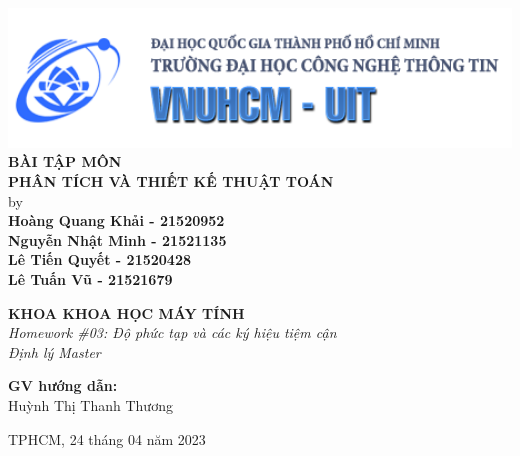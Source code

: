 
\begin{titlepage}

\begin{center}

\includegraphics[width=1\textwidth]{img/banner_uit.png}\\%
\vspace{3em}%
\Large \textbf {BÀI TẬP MÔN\\PHÂN TÍCH VÀ THIẾT KẾ THUẬT TOÁN}\\%
\vspace{1em}%
\normalsize by \\%
\vspace{1em}
\textup{\small\bf {Hoàng Quang Khải - 21520952}\\
{Nguyễn Nhật Minh - 21521135}\\
{Lê Tiến Quyết - 21520428}\\
{Lê Tuấn Vũ - 21521679}
}


 \vspace{1em}%
{\bf KHOA KHOA HỌC MÁY TÍNH}\\[0.5in]

\emph{Homework \#03: Độ phức tạp và các ký hiệu tiệm cận\\
Định lý Master}

\vspace{1in}


\normalsize {\bf GV hướng dẫn:} \\

Huỳnh Thị Thanh Thương\\
\vspace{1em}

\vfill


TPHCM, 24 tháng 04 năm 2023

\end{center}

\end{titlepage}
\newpage
{} %

\onehalfspacing